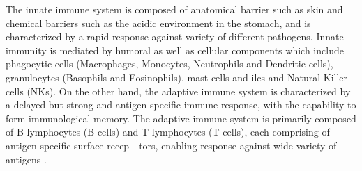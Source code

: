 \par The innate immune system is composed of anatomical barrier such as skin and chemical barriers such as the acidic environment in the stomach, and is characterized by a rapid response against variety of different pathogens. Innate immunity is mediated by humoral as well as cellular components which include phagocytic cells (Macrophages, Monocytes, Neutrophils and Dendritic cells), granulocytes (Basophils and Eosinophils), mast cells and \glspl{ilc} and Natural Killer cells (NKs). On the other hand, the adaptive immune system is characterized by a delayed but strong and antigen-specific immune response, with the capability to form immunological memory. The adaptive immune system is primarily composed of B-lymphocytes (B-cells) and T-lymphocytes (T-cells), each comprising of antigen-specific surface recep- \clearpage -tors, enabling response against wide variety of antigens \textbf{\cite{murphy_janeways_2017,chaplin_overview_2010,marshall_introduction_2018}}.

